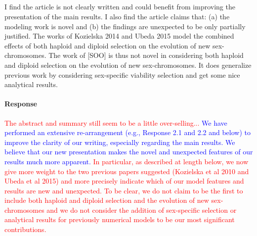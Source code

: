 \documentclass[10pt,letterpaper]{article}
\begin{document}
\noindent\subsection{}
I find the article is not clearly written and could benefit from improving the presentation of the main results. 
%
%
I also find the article claims that: (a) the modeling work is novel and (b) the findings are unexpected to be only partially justified.
%
%
The works of Kozielska 2014 and Ubeda 2015 model the combined effects of both haploid and diploid selection on the evolution of new sex-chromosomes. The work of [SOO] is thus not novel in considering both haploid and diploid selection on the evolution of new sex-chromosomes. It does generalize previous work by considering sex-specific viability selection and get some nice analytical results.

\noindent\paragraph{Response}
\textcolor{red}{The abstract and summary still seem to be a little over-selling...}
\textcolor{blue}{We have performed an extensive re-arrangement (e.g., Response 2.1 and 2.2 and below) to improve the clarity of our writing, especially regarding the main results. 
We believe that our new presentation makes the novel and unexpected features of our results much more apparent. }
\textcolor{red}{In particular, as described at length below, we now give more weight to the two previous papers suggested (Kozielska et al 2010 and Ubeda et al 2015) and more precisely indicate which of our model features and results are new and unexpected.
To be clear, we do not claim to be the first to include both haploid and diploid selection and the evolution of new sex-chromosomes and we do not consider the addition of sex-specific selection or analytical results for previously numerical models to be our most significant contributions. 
}
\end{document}
